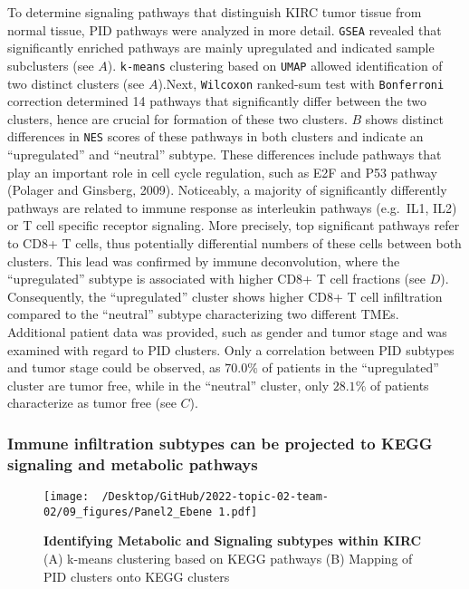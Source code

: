 \documentclass[
  parskip,
  openany]{scrreprt}
\begin{document}
To determine signaling pathways that distinguish KIRC tumor tissue from
normal tissue, PID pathways were analyzed in more detail. \texttt{GSEA}
revealed that significantly enriched pathways are mainly upregulated and
indicated sample subclusters (see  \(A\)). \texttt{k-means}
clustering based on \texttt{UMAP} allowed identification of two distinct
clusters (see  \(A\)).Next, \texttt{Wilcoxon} ranked-sum test
with \texttt{Bonferroni} correction determined 14 pathways that
significantly differ between the two clusters, hence are crucial for
formation of these two clusters. \(B\) shows distinct
differences in \texttt{NES} scores of these pathways in both clusters
and indicate an ``upregulated'' and ``neutral'' subtype. These
differences include pathways that play an important role in cell cycle
regulation, such as E2F and P53 pathway (Polager and Ginsberg, 2009).
Noticeably, a majority of significantly differently pathways are related
to immune response as interleukin pathways (e.g.~IL1, IL2) or T cell
specific receptor signaling. More precisely, top significant pathways
refer to CD8+ T cells, thus potentially differential numbers of these
cells between both clusters. This lead was confirmed by immune
deconvolution, where the ``upregulated'' subtype is associated with
higher CD8+ T cell fractions (see  \(D\)). Consequently, the
``upregulated'' cluster shows higher CD8+ T cell infiltration compared
to the ``neutral'' subtype characterizing two different TMEs.\\
Additional patient data was provided, such as gender and tumor stage and
was examined with regard to PID clusters. Only a correlation between PID
subtypes and tumor stage could be observed, as \(70.0\%\) of patients in
the ``upregulated'' cluster are tumor free, while in the ``neutral''
cluster, only \(28.1\%\) of patients characterize as tumor free (see
 \(C\)).

\hypertarget{immune-infiltration-subtypes-can-be-projected-to-kegg-signaling-and-metabolic-pathways}{%
\subsubsection{Immune infiltration subtypes can be projected to KEGG
signaling and metabolic
pathways}\label{immune-infiltration-subtypes-can-be-projected-to-kegg-signaling-and-metabolic-pathways}}

\begin{figure}[h]
  \texttt{[image: ~/Desktop/GitHub/2022-topic-02-team-02/09\_figures/Panel2\_Ebene 1.pdf]}
  \caption{\textbf{Identifying Metabolic and Signaling subtypes within KIRC} (A) k-means clustering based on KEGG pathways (B) Mapping of PID clusters onto KEGG clusters}
  \label{kegg}
\end{figure}
\end{document}
